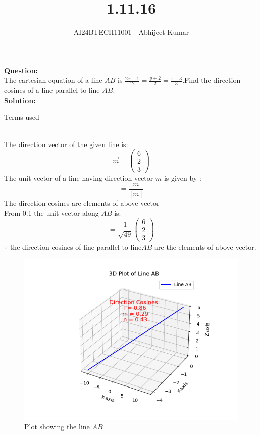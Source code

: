 \documentclass[journal]{IEEEtran}
\begin{document}

\vspace{3cm}

\title{1.11.16}
\author{AI24BTECH11001 - Abhijeet Kumar}
{\let\newpage\relax\maketitle}

\renewcommand{\thefigure}{\theenumi}
\renewcommand{\thetable}{\theenumi}
\setlength{\intextsep}{10pt} %


\renewcommand{\thetable}{\theenumi}


\textbf{Question:}\\
The cartesian equation of a line $AB$ is $\frac{2x-1}{12}=\frac{y+2}{2}=\frac{z-3}{3}$.Find the direction cosines of a line parallel to line $AB$.
\\
\textbf{Solution: }\\
\begin{table}[h!]
    \renewcommand{\thetable}{1}
    \centering
    
    \caption{Terms used}
    \label{TABLE 1:}
\end{table}\\
The direction vector of the given line is$\colon$
\begin{equation*}
    \vec{m}=\begin{pmatrix}
        6\\
        2\\
        3
    \end{pmatrix}
\end{equation*}
The unit vector of a line having direction vector $m$ is given by $\colon$
\begin{equation}
    = \frac{m}{||m||}
\end{equation}
The direction cosines are elements of above vector  \\
From 0.1 the unit vector along $AB$ is$\colon$\\
\begin{equation}
= \frac{1}{\sqrt{49}}\begin{pmatrix}
    6\\
    2\\
    3
\end{pmatrix}
\end{equation}
$\therefore$ the direction cosines of line parallel to line$AB$ are the elements of above vector.
 \begin{figure}[h!]
   \centering
   \includegraphics[width=0.7\linewidth]{figs/figure1.png}
   \caption{Plot showing the line $AB$}
   \label{stemplot}
\end{figure}
\end{document}
